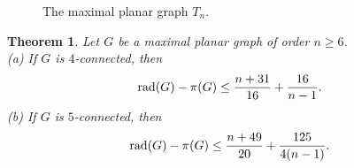 \documentclass[a4paper,11pt]{article}
\newtheorem{theorem}{Theorem}[section]
\begin{document}
\begin{figure}[H]
\begin{center}
{
}
\caption{The maximal planar graph $T_n$.}
\label{fig:triangulation-3-connected}
\end{center}
\end{figure}





\begin{theorem} \label{theo:rad-vs-pi-in-triangulation-4-5-connected}
Let \( G \) be a maximal planar graph of order \( n \geq 6 \). \\
(a) If $G$ is $4$-connected, then 
\[{\rm rad}(G)-\pi(G) \leq \frac{n+31}{16}+\frac{16}{n-1}.\]
(b) If $G$ is $5$-connected, then
\[{\rm rad}(G)-\pi(G) \leq \frac{n+49}{20}+\frac{125}{4(n-1)}.\]
\end{theorem}
\end{document}
